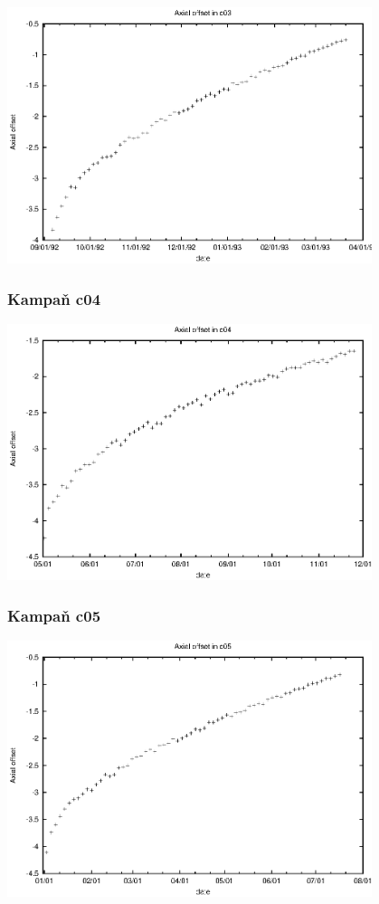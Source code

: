 \documentclass[a4paper,twoside,11pt]{article}
\begin{document}
\begin{center}
\includegraphics[width=0.8\textwidth]{data_c03_ao.eps}
\end{center}


\subsubsection{Kampaň c04}

\begin{center}
\includegraphics[width=0.8\textwidth]{data_c04_ao.eps}
\end{center}


\subsubsection{Kampaň c05}

\begin{center}
\includegraphics[width=0.8\textwidth]{data_c05_ao.eps}
\end{center}
\end{document}
